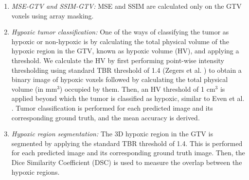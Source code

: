 \begin{enumerate}
    
    \item \textit{MSE-GTV and SSIM-GTV:} MSE and SSIM are calculated only on the GTV voxels using array masking.
    
    \item \textit{Hypoxic tumor classification:} One of the ways of classifying the tumor as hypoxic or non-hypoxic is by calculating the total physical volume of the hypoxic region in the GTV, known as hypoxic volume (HV), and applying a threshold. We calculate the HV by first performing point-wise intensity thresholding using standard TBR threshold of 1.4 (Zegers et al. \cite{zegers2013hypoxia}) to obtain a binary image of hypoxic voxels followed by calculating the total physical volume (in mm$^3$) occupied by them. Then, an HV threshold of 1 cm$^3$ is applied beyond which the tumor is classified as hypoxic, similar to Even et al. \cite{even2017predicting}. Tumor classification is performed for each predicted image and its corresponding ground truth, and the mean accuracy is derived.
    
    \item \textit{Hypoxic region segmentation:} The 3D hypoxic region in the GTV is segmented by applying the standard TBR threshold of 1.4. This is performed for each predicted image and its corresponding ground truth image. Then, the Dice Similarity Coefficient (DSC) is used to measure the overlap between the hypoxic regions. 

\end{enumerate}


